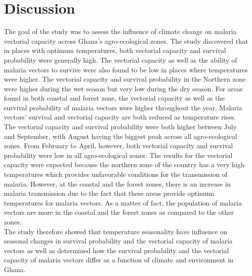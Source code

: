 \section{Discussion}
The goal of the study was to assess the influence of climate change on malaria vectorial capacity across Ghana's agro-ecological zones. The study discovered that in places with optimum temperatures, both vectorial capacity and survival probability were generally high. The vectorial capacity as well as the ability of malaria vectors to survive were also found to be low in places where temperatures were higher.
The vectorial capacity and survival probability in the Northern zone were higher during the wet season but very low during the dry season. For areas found in both coastal and forest zone, the vectorial capacity as well as the survival probability of malaria vectors were higher throughout the year. 
Malaria vectors' survival and vectorial capacity are both reduced as temperature rises. The vectorial capacity and survival probability were both higher between July and September, with August having the biggest peak across all agro-ecological zones. From February to April, however, both vectorial capacity and survival probability were low in all agro-ecological zones. The results for the vectorial capacity were expected because the northern zone of the
country has a very high temperatures which provides unfavorable conditions for the transmission of malaria. However, at the coastal and the forest zones, there is an increase in malaria transmission due to the fact that these areas provide optimum temperatures for malaria vectors. As a matter of fact, the population of malaria vectors are more in the coastal and the forest zones as compared to the other zones.\\

\noindent The study therefore showed that temperature seasonality have influence on seasonal changes in survival probability and the vectorial capacity of malaria vectors as well as determined how the survival probability and the vectorial capacity of malaria vectors differ as a function of climate and environment in Ghana.








